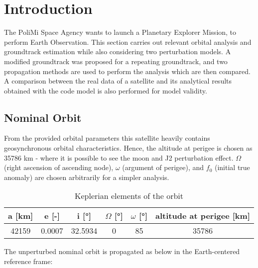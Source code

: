 \section{Introduction}
\label{sec:introduction_cap2}

The PoliMi Space Agency wants to launch a Planetary Explorer Mission, to  perform  Earth Observation. This section carries out relevant orbital analysis and groundtrack estimation while also considering two perturbation models. A modified groundtrack was proposed for a repeating groundtrack, and two propagation methods are used to perform the analysis which are then compared. A comparison between the real data of a satellite and its analytical results obtained with the code model is also performed for model validity.


\subsection{Nominal Orbit}

From the provided orbital parameters this satellite heavily contains geosynchronous orbital characteristics. Hence, the altitude at perigee is chosen as 35786 km - where it is possible to see the moon and J2 perturbation effect. $\Omega$ (right ascension of ascending node), $\omega$ (argument of perigee), and $f_0$ (initial true anomaly) are chosen arbitrarily for a simpler analysis.


\begin{table}[ht]
	\centering
	\label{tab:keplerian_elements}
	\begin{tabular}{|c|c|c|c|c|c|}
		\hline
		a [km] & e [-] & i [°] & $\Omega$ [°] & $\omega$ [°] & altitude at perigee [km] \\
		\hline
		42159 & 0.0007 & 32.5934 & 0 & 85 & 35786 \\
		\hline
	\end{tabular}
	\caption{Keplerian elements of the orbit}
\end{table}

The unperturbed nominal orbit is propagated as below in the Earth-centered reference frame:


